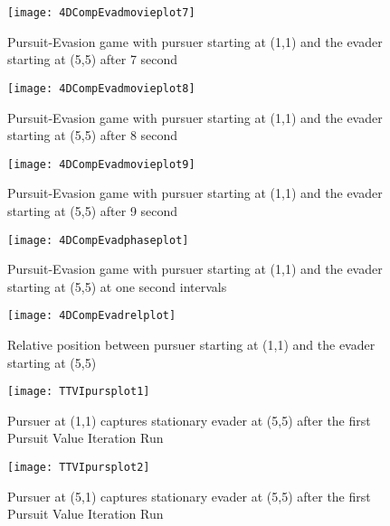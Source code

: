 \begin{figure}
\vspace{2.4in}
\centering
\texttt{[image: 4DCompEvadmovieplot7]}
\caption{Pursuit-Evasion game with pursuer starting at (1,1) and the evader starting at (5,5) after 7 second}
\label{4DCompEvadmovieplot7}
\end{figure}
\clearpage
\newpage

\begin{figure}
\vspace{2.4in}
\centering
\texttt{[image: 4DCompEvadmovieplot8]}
\caption{Pursuit-Evasion game with pursuer starting at (1,1) and the evader starting at (5,5) after 8 second}
\label{4DCompEvadmovieplot8}
\end{figure}
\clearpage
\newpage

\begin{figure}
\vspace{2.4in}
\centering
\texttt{[image: 4DCompEvadmovieplot9]}
\caption{Pursuit-Evasion game with pursuer starting at (1,1) and the evader starting at (5,5) after 9 second}
\label{4DCompEvadmovieplot9}
\end{figure}
\clearpage
\newpage

\begin{figure}
\vspace{2.4in}
\centering
\texttt{[image: 4DCompEvadphaseplot]}
\caption{Pursuit-Evasion game with pursuer starting at (1,1) and the evader starting at (5,5) at one second intervals}
\label{4DCompEvadphaseplot}
\end{figure}
\clearpage
\newpage

\begin{figure}
\vspace{2.4in}
\centering
\texttt{[image: 4DCompEvadrelplot]}
\caption{Relative position between pursuer starting at (1,1) and the evader starting at (5,5)}
\label{4DCompEvadrelplot}
\end{figure}
\clearpage
\newpage

\begin{figure}
\vspace{2.4in}
\centering
\texttt{[image: TTVIpursplot1]}
\caption{Pursuer at (1,1) captures stationary evader at (5,5) after the first Pursuit Value Iteration Run}
\label{TTVIpursplot1}
\end{figure}
\clearpage
\newpage

\begin{figure}
\vspace{2.4in}
\centering
\texttt{[image: TTVIpursplot2]}
\caption{Pursuer at (5,1) captures stationary evader at (5,5) after the first Pursuit Value Iteration Run}
\label{TTVIpursplot2}
\end{figure}
\clearpage
\newpage

